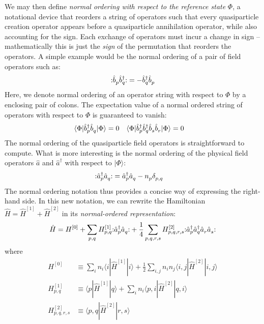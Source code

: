 We may then define \emph{normal ordering with respect to the reference state} $\Phi$, a notational device that reorders a string of operators such that every quasiparticle creation operator appears before a quasiparticle annihilation operator, while also accounting for the sign.  Each exchange of operators must incur a change in sign -- mathematically this is just the \textit{sign} of the permutation that reorders the operators.  A simple example would be the normal ordering of a pair of field operators such as:
\begin{align*}
  \mathopen: \hat{b}_p^{} \hat{b}_q^\dagger \mathclose: =
  -\hat{b}_q^\dagger \hat{b}_p^{}
\end{align*}
Here, we denote normal ordering of an operator string with respect to $\Phi$ by a enclosing pair of colons.  The expectation value of a normal ordered string of operators with respect to $\Phi$ is guaranteed to vanish:
\begin{align*}
&\langle \Phi | \hat{b}_p^\dagger \hat{b}_q^{} | \Phi \rangle = 0 &
&\langle \Phi | \hat{b}_p^\dagger \hat{b}_q^\dagger \hat{b}_s^{} \hat{b}_r^{} | \Phi \rangle = 0
\end{align*}
The normal ordering of the quasiparticle field operators is straightforward to compute.  What is more interesting is the normal ordering of the physical field operators $\hat a$ and $\hat a^\dagger$ with respect to $|\Phi\rangle$:
\begin{align*}
  \mathopen: \hat{a}_p^\dagger \hat{a}_q^{} \mathclose: &=
  \hat{a}_p^\dagger \hat{a}_q^{} - n_p^{} \delta_{p, q}^{}
\end{align*}
The normal ordering notation thus provides a concise way of expressing the right-hand side.  In this new notation, we can rewrite the Hamiltonian $\hat H = \hat{H}^{[1]} + \hat{H}^{[2]}$ in its \emph{normal-ordered representation}:
\begin{align}
  \hat{H} = H^{[0]} + \sum_{p, q} H^{[1]}_{p, q} \mathopen: \hat{a}_p^\dagger \hat{a}_q^{} \mathclose: + \frac{1}{4} \sum_{p, q, r, s} H^{[2]}_{p, q, r, s} \mathopen: \hat{a}_p^\dagger \hat{a}_q^\dagger \hat{a}_r^{} \hat{a}_s^{} \mathclose:
  \label{eq:normordhamiltonian}
\end{align}
where
\begin{align*}
  H^{[0]} &\equiv \sum_{i} n_i \langle i | \hat{H}^{[1]} | i \rangle + \frac{1}{2} \sum_{i, j} n_i n_j \langle i, j | \hat{H}^{[2]} | i , j \rangle \\
  H^{[1]}_{p, q} &\equiv \langle p | \hat{H}^{[1]} | q \rangle + \sum_{i} n_i \langle p, i | \hat{H}^{[2]} | q, i \rangle \\
  H^{[2]}_{p, q, r, s} &\equiv \langle p, q | \hat{H}^{[2]} | r, s \rangle \\
\end{align*}
